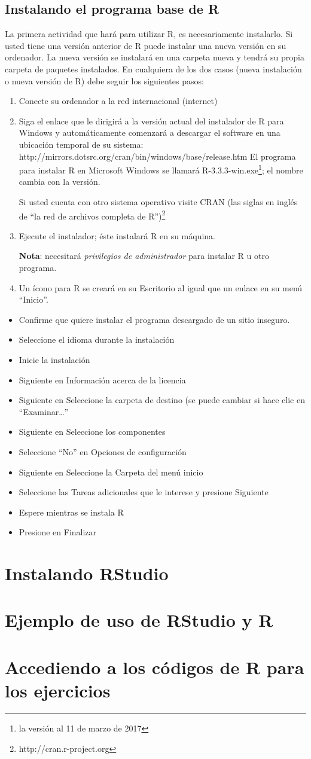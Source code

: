 \documentclass{article}
\begin{document}
\subsection{Instalando el programa base de R}
La primera actividad que hará para utilizar R, es necesariamente instalarlo. Si usted tiene una versión anterior de R puede instalar una nueva versión en su ordenador. La nueva versión se instalará en una carpeta nueva y tendrá su propia carpeta de paquetes instalados. En cualquiera de los dos casos (nueva instalación o nueva versión de R) debe seguir los siguientes pasos:
\begin{enumerate}
\item Conecte su ordenador a la red internacional (internet)
\item Siga el enlace que le dirigirá a la versión actual del instalador de R para Windows y automáticamente comenzará a descargar el software en una ubicación temporal de su sistema: http://mirrors.dotsrc.org/cran/bin/windows/base/release.htm El programa para instalar R en Microsoft Windows se llamará R-3.3.3-win.exe\footnote{la versión al 11 de marzo de 2017}; el nombre cambia con la versión.

Si usted cuenta con otro sistema operativo visite CRAN (las siglas en inglés de ``la red de archivos completa de R'')\footnote{http://cran.r-project.org}

\item Ejecute el instalador; éste instalará R en su máquina.

\textbf{Nota}: necesitará \textit{privilegios de administrador} para instalar R u otro programa.
\item Un ícono para R se creará en su Escritorio al igual que un enlace en su menú ``Inicio''.
\end{enumerate}

\begin{itemize}
\item Confirme que quiere instalar el programa descargado de un sitio inseguro.
\item Seleccione el idioma durante la instalación
\item Inicie la instalación
\item Siguiente en Información acerca de la licencia
\item Siguiente en Seleccione la carpeta de destino (se puede cambiar si hace clic en ``Examinar\ldots''
\item Siguiente en Seleccione los componentes
\item Seleccione ``No'' en Opciones de configuración
\item Siguiente en Seleccione la Carpeta del menú inicio
\item Seleccione las Tareas adicionales que le interese y presione Siguiente
\item Espere mientras se instala R
\item Presione en Finalizar
\end{itemize}

\section{Instalando RStudio}
\section{Ejemplo de uso de RStudio y R}
\section{Accediendo a los códigos de R para los ejercicios}
\end{document}
